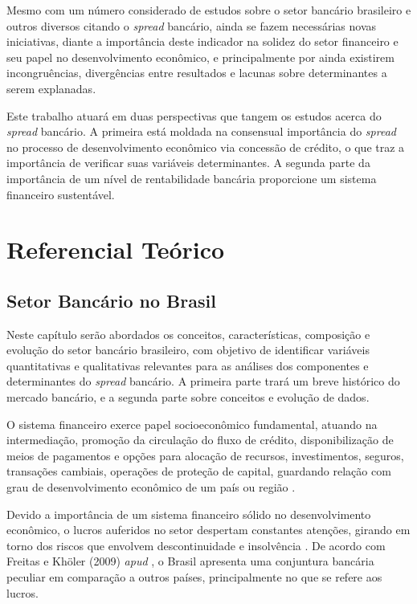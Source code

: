\documentclass[
  12pt,
  12pt,
  openright,
  oneside,
  a4paper,
  chapter=TITLE,
  section=TITLE,
  subsection=TITLE,
  subsubsection=TITLE,
  english,
  portugues,
  sumario=tradicional]{abntex2}
\begin{document}
Mesmo com um número considerado de estudos sobre o setor bancário brasileiro e outros diversos citando o \emph{spread} bancário, ainda se fazem necessárias novas iniciativas, diante a importância deste indicador na solidez do setor financeiro e seu papel no desenvolvimento econômico, e principalmente por ainda existirem incongruências, divergências entre resultados e lacunas sobre determinantes a serem explanadas.

Este trabalho atuará em duas perspectivas que tangem os estudos acerca do \emph{spread} bancário. A primeira está moldada na consensual importância do \emph{spread} no processo de desenvolvimento econômico via concessão de crédito, o que traz a importância de verificar suas variáveis determinantes. A segunda parte da importância de um nível de rentabilidade bancária proporcione um sistema financeiro sustentável.

\textual
\pagestyle{simple}

\parindent 1.50cm

\chapter{Referencial Teórico}

\section{Setor Bancário no Brasil}

Neste capítulo serão abordados os conceitos, características, composição e evolução do setor bancário brasileiro, com objetivo de identificar variáveis quantitativas e qualitativas relevantes para as análises dos componentes e determinantes do \emph{spread} bancário. A primeira parte trará um breve histórico do mercado bancário, e a segunda parte sobre conceitos e evolução de dados.

O sistema financeiro exerce papel socioeconômico fundamental, atuando na intermediação, promoção da circulação do fluxo de crédito, disponibilização de meios de pagamentos e opções para alocação de recursos, investimentos, seguros, transações cambiais, operações de proteção de capital, guardando relação com grau de desenvolvimento econômico de um país ou região \cite{maffili:2009}.

Devido a importância de um sistema financeiro sólido no desenvolvimento econômico, o lucros auferidos no setor despertam constantes atenções, girando em torno dos riscos que envolvem descontinuidade e insolvência \cite{couto:2002}. De acordo com Freitas e Khöler (2009) \emph{apud} \textcite{dantas:2012}, o Brasil apresenta uma conjuntura bancária peculiar em comparação a outros países, principalmente no que se refere aos lucros.
\end{document}
